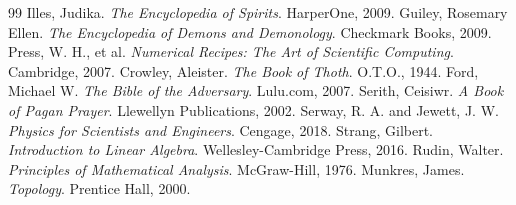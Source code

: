 \documentclass[11pt, letterpaper]{article}
\begin{document}
\begin{thebibliography}{99}
 Illes, Judika. \textit{The Encyclopedia of Spirits}. HarperOne, 2009.
 Guiley, Rosemary Ellen. \textit{The Encyclopedia of Demons and Demonology}. Checkmark Books, 2009.
 Press, W. H., et al. \textit{Numerical Recipes: The Art of Scientific Computing}. Cambridge, 2007.
 Crowley, Aleister. \textit{The Book of Thoth}. O.T.O., 1944.
 Ford, Michael W. \textit{The Bible of the Adversary}. Lulu.com, 2007.
 Serith, Ceisiwr. \textit{A Book of Pagan Prayer}. Llewellyn Publications, 2002.
 Serway, R. A. and Jewett, J. W. \textit{Physics for Scientists and Engineers}. Cengage, 2018.
 Strang, Gilbert. \textit{Introduction to Linear Algebra}. Wellesley-Cambridge Press, 2016.
 Rudin, Walter. \textit{Principles of Mathematical Analysis}. McGraw-Hill, 1976.
 Munkres, James. \textit{Topology}. Prentice Hall, 2000.

\end{thebibliography}
\end{document}

